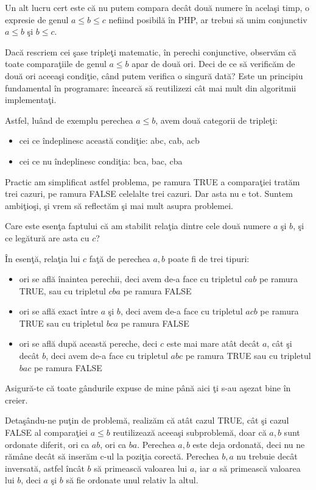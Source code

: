 Un alt lucru cert este că nu putem compara decât două numere în acelaşi timp, o expresie
de genul  $a \leq b \leq c$ nefiind posibilă în PHP, ar trebui să unim conjunctiv
 $a \leq b $ şi $b \leq c$.

Dacă rescriem cei şase tripleţi matematic, în perechi conjunctive, observăm că toate
comparaţiile de genul $a \leq b$ apar de două ori. Deci de ce să verificăm de două
ori aceeaşi condiţie, când putem verifica o singură dată? Este un principiu fundamental
în programare: încearcă să reutilizezi cât mai mult din algoritmii implementaţi.

Astfel, luând de exemplu perechea $a \leq b$, avem două categorii de tripleţi:
\begin{itemize}
\item cei ce îndeplinesc această condiţie: abc, cab, acb
\item cei ce nu îndeplinesc condiţia: bca, bac, cba
\end{itemize}

Practic am simplificat astfel problema, pe ramura TRUE
a comparaţiei tratăm trei cazuri, pe ramura FALSE celelalte
trei cazuri. Dar asta nu e tot. Suntem ambiţioşi, şi vrem să
reflectăm şi mai mult asupra problemei.

Care este esenţa faptului că am stabilit relaţia dintre cele două
numere $a$ şi $b$, şi ce legătură are asta cu $c$?

În esenţă, relaţia lui $c$ faţă de perechea $a,b$ poate fi de trei tipuri:
\begin{itemize}
\item ori se află înaintea perechii, deci avem de-a face cu tripletul $cab$ pe ramura TRUE,
sau cu tripletul $cba$ pe ramura FALSE
\item ori se află exact între $a$ şi $b$, deci avem de-a face cu tripletul $acb$ pe ramura TRUE sau
cu tripletul $bca$ pe ramura FALSE
\item ori se află după această pereche, deci $c$ este mai mare atât decât $a$, cât şi
decât $b$, deci avem de-a face cu tripletul $abc$ pe ramura TRUE sau cu tripletul
$bac$ pe ramura FALSE
\end{itemize}

Asigură-te că toate gândurile expuse de mine până aici ţi s-au aşezat bine în creier.

Detaşându-ne puţin de problemă, realizăm că atât cazul TRUE, cât şi cazul FALSE al comparaţiei
$a \leq b$ reutilizează aceeaşi subproblemă, doar că $a,b$ sunt ordonate diferit, ori ca $ab$, ori ca
$ba$. Perechea $a,b$ este deja ordonată, deci nu ne rămâne decât să inserăm c-ul la poziţia corectă.
Perechea $b,a$ nu trebuie decât inversată, astfel încât $b$ să primească valoarea lui $a$, iar $a$ să
primească valoarea lui $b$, deci $a$ şi $b$ să fie ordonate unul relativ la altul.


